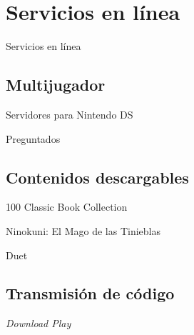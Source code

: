 
\section{Servicios en línea}
\begin{frame}{Servicios en línea}
\end{frame}

\subsection{Multijugador}
\begin{frame}{Servidores para Nintendo DS}

\end{frame}

\begin{frame}{Preguntados}

\end{frame}

\subsection{Contenidos descargables}
\begin{frame}{100 Classic Book Collection}

\end{frame}

\begin{frame}{Ninokuni: El Mago de las Tinieblas}

\end{frame}

\begin{frame}{Duet}

\end{frame}

\subsection{Transmisión de código}
\begin{frame}{\textit{Download Play}}

\end{frame}
